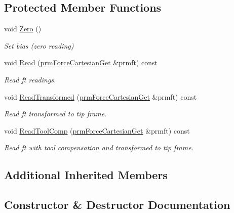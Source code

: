 \subsection*{Protected Member Functions}
\begin{DoxyCompactItemize}
\item 
void \hyperlink{classmts_j_r3_force_sensor_a4608eb3b3309a7e5465b02f7298b1498}{Zero} ()
\begin{DoxyCompactList}\small\item\em Set bias (zero reading) \end{DoxyCompactList}\item 
void \hyperlink{classmts_j_r3_force_sensor_ab099691a9a2b7966c91d53adb3510718}{Read} (\hyperlink{classprm_force_cartesian_get}{prm\+Force\+Cartesian\+Get} \&prmft) const 
\begin{DoxyCompactList}\small\item\em Read ft readings. \end{DoxyCompactList}\item 
void \hyperlink{classmts_j_r3_force_sensor_afabe5cf81353bf58913155fc96724552}{Read\+Transformed} (\hyperlink{classprm_force_cartesian_get}{prm\+Force\+Cartesian\+Get} \&prmft) const 
\begin{DoxyCompactList}\small\item\em Read ft transformed to tip frame. \end{DoxyCompactList}\item 
void \hyperlink{classmts_j_r3_force_sensor_a46c3f4de1e24f1f8def30c3f26026a9c}{Read\+Tool\+Comp} (\hyperlink{classprm_force_cartesian_get}{prm\+Force\+Cartesian\+Get} \&prmft) const 
\begin{DoxyCompactList}\small\item\em Read ft with tool compensation and transformed to tip frame. \end{DoxyCompactList}\end{DoxyCompactItemize}
\subsection*{Additional Inherited Members}


\subsection{Constructor \& Destructor Documentation}
\hypertarget{classmts_j_r3_force_sensor_ae258b22c0f978ad9295a2188459db1b3}{}
